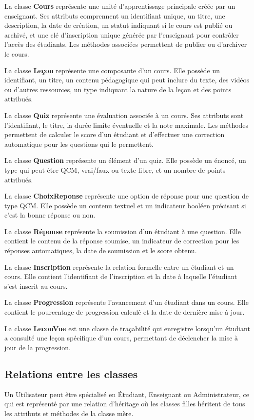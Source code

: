 \documentclass[12pt,a4paper]{report}
\begin{document}
La classe \textbf{Cours} représente une unité d'apprentissage principale créée par un enseignant. Ses attributs comprennent un identifiant unique, un titre, une description, la date de création, un statut indiquant si le cours est publié ou archivé, et une clé d'inscription unique générée par l'enseignant pour contrôler l'accès des étudiants. Les méthodes associées permettent de publier ou d'archiver le cours.

La classe \textbf{Leçon} représente une composante d'un cours. Elle possède un identifiant, un titre, un contenu pédagogique qui peut inclure du texte, des vidéos ou d'autres ressources, un type indiquant la nature de la leçon et des points attribués.

La classe \textbf{Quiz} représente une évaluation associée à un cours. Ses attributs sont l'identifiant, le titre, la durée limite éventuelle et la note maximale. Les méthodes permettent de calculer le score d'un étudiant et d'effectuer une correction automatique pour les questions qui le permettent.

La classe \textbf{Question} représente un élément d'un quiz. Elle possède un énoncé, un type qui peut être QCM, vrai/faux ou texte libre, et un nombre de points attribués. 

La classe \textbf{ChoixReponse} représente une option de réponse pour une question de type QCM. Elle possède un contenu textuel et un indicateur booléen précisant si c'est la bonne réponse ou non.

La classe \textbf{Réponse} représente la soumission d'un étudiant à une question. Elle contient le contenu de la réponse soumise, un indicateur de correction pour les réponses automatiques, la date de soumission et le score obtenu. 

La classe \textbf{Inscription} représente la relation formelle entre un étudiant et un cours. Elle contient l'identifiant de l'inscription et la date à laquelle l'étudiant s'est inscrit au cours.

La classe \textbf{Progression} représente l'avancement d'un étudiant dans un cours. Elle contient le pourcentage de progression calculé et la date de dernière mise à jour.

La classe \textbf{LeconVue} est une classe de traçabilité qui enregistre lorsqu'un étudiant a consulté une leçon spécifique d'un cours, permettant de déclencher la mise à jour de la progression.

\subsection{Relations entre les classes}
Un Utilisateur peut être spécialisé en Étudiant, Enseignant ou Administrateur, ce qui est représenté par une relation d'héritage où les classes filles héritent de tous les attributs et méthodes de la classe mère.
\end{document}
